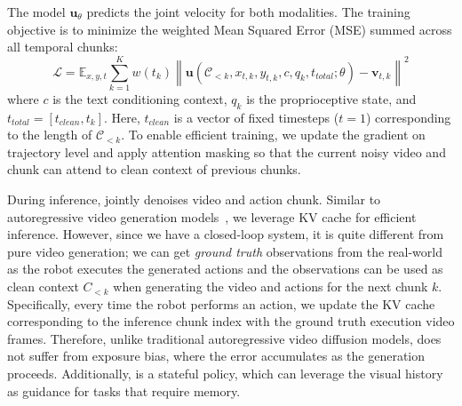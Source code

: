 The model $\mathbf{u}_{\theta}$ predicts the joint velocity for both modalities. The training objective is to minimize the weighted Mean Squared Error (MSE) summed across all temporal chunks:
\begin{equation}
    \mathcal{L} = \mathbb{E}_{x, y, t} \sum_{k=1}^{K} w(t_k) \left\| \mathbf{u}(\mathcal{C}_{<k}, x_{t,k}, y_{t,k}, c, q_{k},  t_{total}; \theta) - \mathbf{v}_{t,k} \right\|^2
\end{equation}
where $c$ is the text conditioning context, $q_{k}$ is the proprioceptive state, and $t_{total}=[t_{clean}, t_k]$. Here, $t_{clean}$ is a vector of fixed timesteps ($t=1$) corresponding to the length of $\mathcal{C}_{<k}$. To enable efficient training, we update the gradient on trajectory level and apply attention masking so that the current noisy video and chunk can attend to clean context of previous chunks.


During inference, \ourmethod jointly denoises video and action chunk. Similar to autoregressive video generation models~\citep{huang2025self, teng2025magi, yin2025slow}, we leverage KV cache for efficient inference. However, since we have a closed-loop system, it is quite different from pure video generation; we can get \textit{ground truth} observations from the real-world as the robot executes the generated actions and the observations can be used as clean context ${C}_{<k}$ when generating the video and actions for the next chunk $k$. Specifically, every time the robot performs an action, we update the KV cache corresponding to the inference chunk index with the ground truth execution video frames. 
Therefore, unlike traditional autoregressive video diffusion models, \ourmethod does not suffer from exposure bias, where the error accumulates as the generation proceeds. Additionally, \ourmethod is a stateful policy, which can leverage the visual history as guidance for tasks that require memory.
